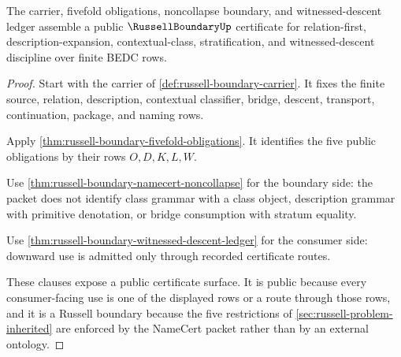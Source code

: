 \begin{theorem}
\label{thm:russell-boundary-public-certificate}
The carrier, fivefold obligations, noncollapse boundary, and witnessed-descent ledger assemble a public $\RussellBoundaryUp$ certificate for relation-first, description-expansion, contextual-class, stratification, and witnessed-descent discipline over finite BEDC rows.
\end{theorem}
\begin{proof}
Start with the carrier of \autoref{def:russell-boundary-carrier}. It fixes the finite source, relation, description, contextual classifier, bridge, descent, transport, continuation, package, and naming rows.

Apply \autoref{thm:russell-boundary-fivefold-obligations}. It identifies the five public obligations by their rows $O,D,K,L,W$.

Use \autoref{thm:russell-boundary-namecert-noncollapse} for the boundary side: the packet does not identify class grammar with a class object, description grammar with primitive denotation, or bridge consumption with stratum equality.

Use \autoref{thm:russell-boundary-witnessed-descent-ledger} for the consumer side: downward use is admitted only through recorded certificate routes.

These clauses expose a public certificate surface. It is public because every consumer-facing use is one of the displayed rows or a route through those rows, and it is a Russell boundary because the five restrictions of \autoref{sec:russell-problem-inherited} are enforced by the NameCert packet rather than by an external ontology.
\end{proof}


